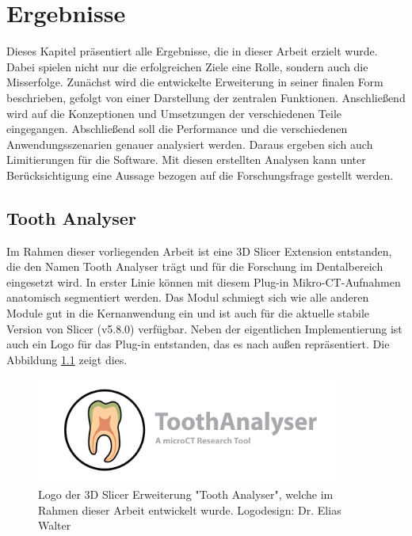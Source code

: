 \chapter{Ergebnisse}
\label{chap:ergebnisse} Dieses Kapitel präsentiert alle Ergebnisse, die in
dieser Arbeit erzielt wurde. Dabei spielen nicht nur die erfolgreichen Ziele eine
Rolle, sondern auch die Misserfolge. Zunächst wird die entwickelte Erweiterung in
seiner finalen Form beschrieben, gefolgt von einer Darstellung der zentralen
Funktionen. Anschließend wird auf die Konzeptionen und Umsetzungen der verschiedenen
Teile eingegangen. Abschließend soll die Performance und die verschiedenen
Anwendungsszenarien genauer analysiert werden. Daraus ergeben sich auch Limitierungen
für die Software. Mit diesen erstellten Analysen kann unter Berücksichtigung
eine Aussage bezogen auf die Forschungsfrage gestellt werden.

\section{Tooth Analyser}
\label{sec:tooth_analyser} Im Rahmen dieser vorliegenden Arbeit ist eine 3D
Slicer Extension entstanden, die den Namen Tooth Analyser trägt und für die Forschung
im Dentalbereich eingesetzt wird. In erster Linie können mit diesem Plug-in
Mikro-\ac{CT}-Aufnahmen anatomisch segmentiert werden. Das Modul schmiegt sich
wie alle anderen Module gut in die Kernanwendung ein und ist auch für die
aktuelle stabile Version von Slicer (v5.8.0) verfügbar. Neben der eigentlichen Implementierung
ist auch ein Logo für das Plug-in entstanden, das es nach außen repräsentiert. Die
Abbildung \ref{fig:logo_tooth_analyser} zeigt dies.

\begin{figure}[h]
	\centering
	\includegraphics[width=0.9\textwidth]{img/SlicerToothAnalyser.png}
	\caption{Logo der 3D Slicer Erweiterung "Tooth Analyser", welche im Rahmen dieser
	Arbeit entwickelt wurde. Logodesign: Dr. Elias Walter}
	\label{fig:logo_tooth_analyser}
\end{figure}


